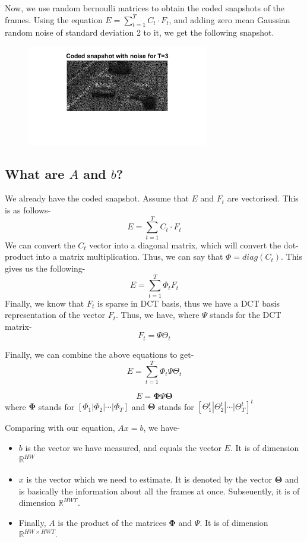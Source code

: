 \documentclass[a4paper,11pt]{article}
\numberwithin{definition}{section}
\numberwithin{mytheorem}{subsection}
\begin{document}
Now, we use random bernoulli matrices to obtain the coded snapshots of the frames. Using the equation $E = \sum \limits_{t=1}^TC_t \cdot F_t$, and adding zero mean Gaussian random noise of standard deviation 2 to it, we get the following snapshot.


\begin{figure}[!h]
    \centering
    \includegraphics[width=300px]{"Coded_Snapshot_T=3.png"}
\end{figure}


\subsection{What are $A$ and $b$?}

We already have the coded snapshot. Assume that $E$ and $F_t$ are vectorised. This is as follows-
$$E = \sum \limits_{t=1}^TC_t \cdot F_t$$
We can convert the $C_t$ vector into a diagonal matrix, which will convert the dot-product into a matrix multiplication. Thus, we can say that $\Phi = diag(C_t)$. This gives us the following-
$$E = \sum \limits_{t=1}^T\Phi_t F_t$$
Finally, we know that $F_t$ is sparse in DCT basis, thus we have a DCT basis representation of the vector $F_t$.
Thus, we have, where $\Psi$ stands for the DCT matrix-
$$F_t = \Psi \Theta_t$$

Finally, we can combine the above equations to get-
$$E = \sum \limits_{t=1}^T\Phi_t \Psi \Theta_t$$

$$E = \boldsymbol{\Phi} \Psi \boldsymbol{\Theta}$$
where $\boldsymbol{\Phi}$ stands for $[\Phi_1|\Phi_2|\cdots|\Phi_T]$ and $\boldsymbol{\Theta}$ stands for $[\Theta_1^t|\Theta_2^t|\cdots|\Theta_T^t]^t$

Comparing with our equation, $Ax = b$, we have-
\begin{itemize}
    \item $b$ is the vector we have measured, and equals the vector $E$. It is of dimension $\mathbb{R}^{HW}$
    \item $x$ is the vector which we need to estimate. It is denoted by the vector $\boldsymbol{\Theta}$ and is basically the information about all the frames at once. Subseuently, it is of dimension $\mathbb{R}^{HWT}$.
    \item Finally, $A$ is the product of the matrices $\boldsymbol{\Phi}$ and $\Psi$. It is of dimension $\mathbb{R}^{HW \times HWT}$.
\end{itemize}
\end{document}
